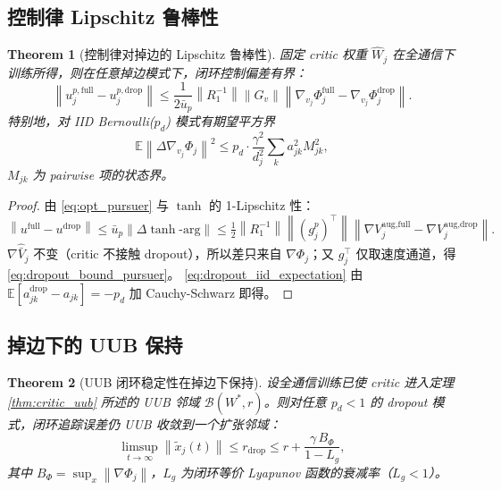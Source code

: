 \documentclass[11pt,a4paper]{article}
\newcommand{\E}{\mathbb{E}}
\newcommand{\ubar}{\bar{u}}
\newcommand{\norm}[1]{\left\lVert #1 \right\rVert}
\newtheorem{theorem}{Theorem}
\theoremstyle{remark}
\begin{document}
\subsection{控制律 Lipschitz 鲁棒性}

\begin{theorem}[控制律对掉边的 Lipschitz 鲁棒性]\label{thm:dropout_lipschitz}
固定 critic 权重 $\hat W_j$ 在全通信下训练所得，则在任意掉边模式下，闭环控制偏差有界：
\begin{equation}
\norm{u_j^{p,\text{full}}-u_j^{p,\text{drop}}}
\le\frac{1}{2\ubar_p}\norm{R_1^{-1}}\norm{G_v}
\norm{\nabla_{v_j}\Phi_j^{\text{full}}-\nabla_{v_j}\Phi_j^{\text{drop}}}.
\label{eq:dropout_bound_pursuer}
\end{equation}
特别地，对 IID Bernoulli($p_d$) 模式有期望平方界
\begin{equation}
\E\norm{\Delta\nabla_{v_j}\Phi_j}^2 \le p_d\cdot\frac{\gamma^2}{d_j^2}\sum_k a_{jk}^2 M_{jk}^2,
\label{eq:dropout_iid_expectation}
\end{equation}
$M_{jk}$ 为 pairwise 项的状态界。
\end{theorem}

\begin{proof}
由 \eqref{eq:opt_pursuer} 与 $\tanh$ 的 1-Lipschitz 性：
\begin{equation}
\norm{u^{\text{full}}-u^{\text{drop}}}
\le\ubar_p\norm{\Delta\tanh\text{-arg}}
\le\tfrac{1}{2}\norm{R_1^{-1}}\norm{(g_j^p)^\top}\norm{\nabla V_j^{\text{aug,full}}-\nabla V_j^{\text{aug,drop}}}.
\end{equation}
$\nabla\hat{\bar V}_j$ 不变（critic 不接触 dropout），所以差只来自 $\nabla\Phi_j$；又 $g_j^\top$ 仅取速度通道，得 \eqref{eq:dropout_bound_pursuer}。
\eqref{eq:dropout_iid_expectation} 由 $\E[a_{jk}^{\text{drop}}-a_{jk}]=−p_d$ 加 Cauchy-Schwarz 即得。
\end{proof}

\subsection{掉边下的 UUB 保持}

\begin{theorem}[UUB 闭环稳定性在掉边下保持]\label{thm:dropout_uub}
设全通信训练已使 critic 进入定理 \ref{thm:critic_uub} 所述的 UUB 邻域 $\mathcal B(W^*,r)$。则对任意 $p_d<1$ 的 dropout 模式，闭环追踪误差仍 UUB 收敛到一个扩张邻域：
\begin{equation}
\limsup_{t\to\infty}\norm{\tilde x_j(t)}\le r_{\text{drop}}\le r+\frac{\gamma\,B_\Phi}{1-L_g},
\label{eq:dropout_uub_radius}
\end{equation}
其中 $B_\Phi=\sup_x\norm{\nabla\Phi_j}$，$L_g$ 为闭环等价 Lyapunov 函数的衰减率（$L_g<1$）。
\end{theorem}
\end{document}
